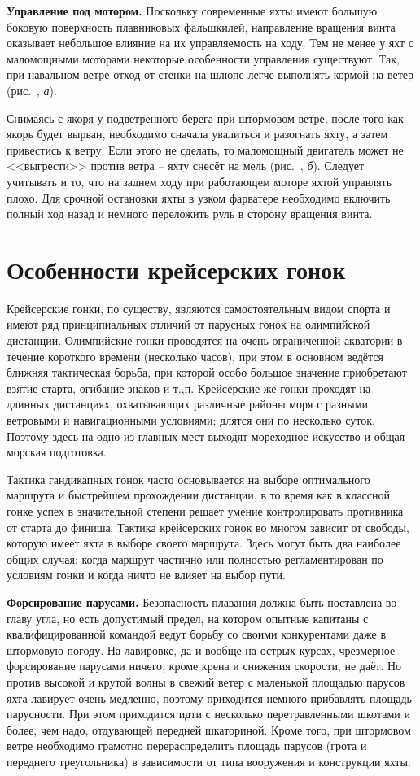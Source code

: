 \textbf{Управление под мотором.} Поскольку современные яхты имеют
большую боковую поверхность плавниковых фальшкилей, направление
вращения винта оказывает небольшое влияние на их управляемость на
ходу. Тем не менее у яхт с маломощными моторами некоторые особенности
управления существуют. Так, при навальном ветре отход от стенки на
шлюпе  легче выполнять кормой на ветер (рис.~,
\textit{а}).

Снимаясь с якоря у подветренного берега при штормовом ветре, после
того как якорь будет вырван, необходимо сначала увалиться и разогнать
яхту, а затем привестись к ветру. Если этого не сделать, то маломощный
двигатель может не <<выгрести>> против ветра \--- яхту снесёт на мель
(рис.~, \textit{б}). Следует учитывать и то, что на заднем
ходу при работающем моторе яхтой управлять плохо.  Для срочной
остановки яхты в узком фарватере необходимо включить полный ход назад
и немного переложить руль в сторону вращения винта.

\section{Особенности крейсерских гонок}

Крейсерские гонки, по существу, являются самостоятельным видом спорта
и имеют ряд принципиальных отличий от парусных гонок на олимпийской
дистанции. Олимпийские гонки проводятся на очень ограниченной
акватории в течение короткого времени (несколько часов), при этом в
основном ведётся ближняя тактическая борьба, при которой особо большое
значение приобретают взятие старта, огибание знаков и
т.\=,п. Крейсерские же гонки проходят на длинных дистанциях,
охватывающих различные районы моря с разными ветровыми и
навигационными условиями; длятся они по несколько суток. Поэтому здесь
на одно из главных мест выходят мореходное искусство и общая морская
подготовка.

Тактика гандикапных гонок часто основывается на выборе оптимального
маршрута и быстрейшем прохождении дистанции, в то время как в классной
гонке успех в значительной степени решает умение контролировать
противника от старта до финиша. Тактика крейсерских гонок во многом
зависит от свободы, которую имеет яхта в выборе своего маршрута. Здесь
могут быть два наиболее общих случая: когда маршрут частично или
полностью регламентирован по условиям гонки и когда ничто не влияет на
выбор пути.

\textbf{Форсирование парусами.} Безопасность плавания должна быть
поставлена во главу угла, но есть допустимый предел, на котором
опытные капитаны с квалифицированной командой ведут борьбу со своими
конкурентами даже в штормовую погоду. На лавировке, да и вообще на
острых курсах, чрезмерное форсирование парусами ничего, кроме крена и
снижения скорости, не даёт. Но против высокой и крутой волны в свежий
ветер с маленькой площадью парусов яхта лавирует очень медленно,
поэтому приходится немного прибавлять площадь парусности. При этом
приходится идти с несколько перетравленными шкотами и более, чем надо,
отдувающей передней шкаториной. Кроме того, при штормовом ветре
необходимо грамотно перераспределить площадь парусов (грота и
переднего треугольника) в зависимости от типа вооружения и конструкции
яхты.

